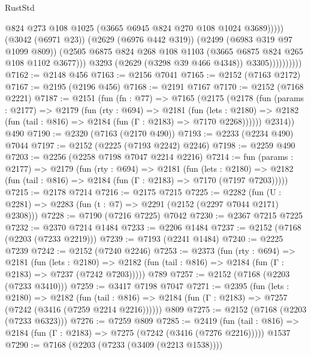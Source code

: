 \begin{lexlean}{RustStd}
\begin{coremodule}
                                  @824
                                  @273
                                  @108
                                  @1025
                                  (@3665 @6945 @824 @270 @108 @1024 @3689)))))
                          (@3042 (@6971 @23))
                          (@2629 (@6976 @442 @319))
                          (@2499 (@6983 @319 @97 @1099 @809))
                          (@2505
                            @6875
                            @824
                            @268
                            @108
                            @1103
                            (@3665 @6875 @824 @265 @108 @1102 @3677)))
                        @3293
                        (@2629 (@3298 @39 @466 @4348))
                        @3305))))))))))
@7162 := @2148 @456
@7163 := @2156 @7041
@7165 := @2152 (@7163 @2172)
@7167 := @2195 (@2196 @456)
@7168 := @2191 @7167
@7170 := @2152 (@7168 @2221)
@7187 := @2151
    (fun (fn : @77) =>
    @7165
      (@2175
        (@2178
          (fun (params : @2177) =>
          @2179
            (fun (rty : @694) =>
            @2181
              (fun (lets : @2180) =>
              @2182 (fun (tail : @816) => @2184 (fun (Γ : @2183) => @7170 @2268))))))
        @2314))
    @490
@7190 := @2320 (@7163 (@2170 @490))
@7193 := @2233 (@2234 @490) @7044
@7197 := @2152 (@2225 (@7193 @2242) @2246)
@7198 := @2259 @490
@7203 := @2256 (@2258 @7198 @7047 @2214 @2216)
@7214 := fun (params : @2177) =>
  @2179
    (fun (rty : @694) =>
    @2181
      (fun (lets : @2180) =>
      @2182 (fun (tail : @816) => @2184 (fun (Γ : @2183) => @7170 (@7197 @7203)))))
@7215 := @2178 @7214
@7216 := @2175 @7215
@7225 := @2282 (fun (U : @2281) => @2283 (fun (t : @7) => @2291 (@2152 (@2297 @7044 @2171) @2308)))
@7228 := @7190 (@7216 @7225) @7042
@7230 := @2367 @7215 @7225
@7232 := @2370 @7214 @1484
@7233 := @2206 @1484
@7237 := @2152 (@7168 (@2203 (@7233 @2219)))
@7239 := @7193 (@2241 @1484)
@7240 := @2225 @7239
@7242 := @2152 (@7240 @2246)
@7253 := @2373
    (fun (rty : @694) =>
    @2181
      (fun (lets : @2180) =>
      @2182 (fun (tail : @816) => @2184 (fun (Γ : @2183) => @7237 (@7242 @7203)))))
    @789
@7257 := @2152 (@7168 (@2203 (@7233 @3410)))
@7259 := @3417 @7198 @7047
@7271 := @2395
    (fun (lets : @2180) =>
    @2182
      (fun (tail : @816) => @2184 (fun (Γ : @2183) => @7257 (@7242 (@3416 (@7259 @2214 @2216))))))
    @809
@7275 := @2152 (@7168 (@2203 (@7233 @6323)))
@7276 := @7259 @809
@7285 := @2419
    (fun (tail : @816) => @2184 (fun (Γ : @2183) => @7275 (@7242 (@3416 (@7276 @2216)))))
    @1537
@7290 := @7168 (@2203 (@7233 (@3409 (@2213 @1538))))

\end{coremodule}
\end{lexlean}
